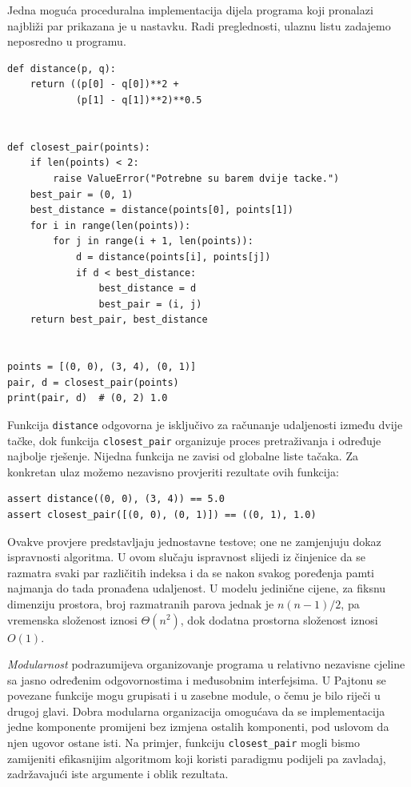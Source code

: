 Jedna moguća proceduralna implementacija dijela programa koji pronalazi najbliži par prikazana je u nastavku. Radi preglednosti, ulaznu listu zadajemo neposredno u programu.

\begin{verbatim}
def distance(p, q):
    return ((p[0] - q[0])**2 +
            (p[1] - q[1])**2)**0.5


def closest_pair(points):
    if len(points) < 2:
        raise ValueError("Potrebne su barem dvije tacke.")
    best_pair = (0, 1)
    best_distance = distance(points[0], points[1])
    for i in range(len(points)):
        for j in range(i + 1, len(points)):
            d = distance(points[i], points[j])
            if d < best_distance:
                best_distance = d
                best_pair = (i, j)
    return best_pair, best_distance


points = [(0, 0), (3, 4), (0, 1)]
pair, d = closest_pair(points)
print(pair, d)  # (0, 2) 1.0
\end{verbatim}

Funkcija \texttt{distance} odgovorna je isključivo za računanje udaljenosti između dvije tačke, dok funkcija \texttt{closest\_pair} organizuje proces pretraživanja i određuje najbolje rješenje. Nijedna funkcija ne zavisi od globalne liste tačaka. Za konkretan ulaz možemo nezavisno provjeriti rezultate ovih funkcija:

\begin{verbatim}
assert distance((0, 0), (3, 4)) == 5.0
assert closest_pair([(0, 0), (0, 1)]) == ((0, 1), 1.0)
\end{verbatim}

Ovakve provjere predstavljaju jednostavne testove; one ne zamjenjuju dokaz ispravnosti algoritma. U ovom slučaju ispravnost slijedi iz činjenice da se razmatra svaki par različitih indeksa i da se nakon svakog poređenja pamti najmanja do tada pronađena udaljenost. U modelu jedinične cijene, za fiksnu dimenziju prostora, broj razmatranih parova jednak je $n(n-1)/2$, pa vremenska složenost iznosi $\Theta(n^2)$, dok dodatna prostorna složenost iznosi $O(1)$.

\textit{Modularnost} podrazumijeva organizovanje programa u relativno nezavisne cjeline sa jasno određenim odgovornostima i međusobnim interfejsima. U Pajtonu se povezane funkcije mogu grupisati i u zasebne module, o čemu je bilo riječi u drugoj glavi. Dobra modularna organizacija omogućava da se implementacija jedne komponente promijeni bez izmjena ostalih komponenti, pod uslovom da njen ugovor ostane isti. Na primjer, funkciju \texttt{closest\_pair} mogli bismo zamijeniti efikasnijim algoritmom koji koristi paradigmu podijeli pa zavladaj, zadržavajući iste argumente i oblik rezultata.

